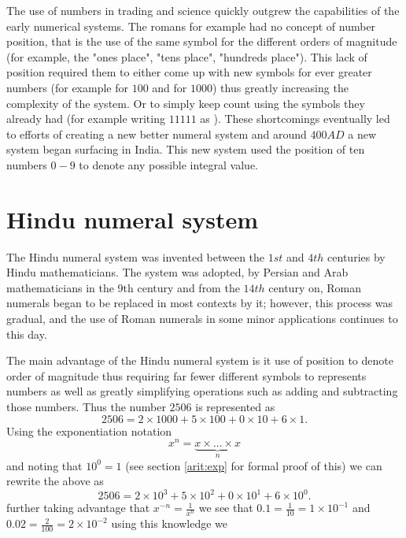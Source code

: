 \myindent The use of numbers in trading and science quickly outgrew the capabilities of the early numerical systems. The romans for example had no concept of number position, that is the use of the same symbol for the different orders of magnitude (for example, the "ones place", "tens place", "hundreds place"). This lack of position required them to either come up with new symbols for ever greater numbers (for example  for $100$ and  for $1000$) thus greatly increasing the complexity of the system. Or to simply keep count using the symbols they already had (for example writing $11111$ as ). These shortcomings eventually led to efforts of creating a new better numeral system and around $400 AD$ a new system began surfacing in India. This new system used the position of ten numbers $0-9$ to denote any possible integral value.

\section{Hindu numeral system}
The Hindu numeral system was invented between the $1st$ and $4th$ centuries by Hindu mathematicians. The system was adopted, by Persian and Arab mathematicians in the 9th century and from the $14th$ century on, Roman numerals began to be replaced in most contexts by it; however, this process was gradual, and the use of Roman numerals in some minor applications continues to this day.

The main advantage of the Hindu numeral system is it use of position to denote order of magnitude thus requiring far fewer different symbols to represents numbers as well as greatly simplifying operations such as adding and subtracting those numbers. Thus the number $2506$ is represented as
\[
2506 = 2 \times 1000 + 5 \times 100 + 0 \times 10 + 6 \times 1.
\]
Using the exponentiation notation
\[
x^n = \underbrace{x \times \dots \times x}_n
\]
and noting that $10^0 = 1$ (see section \ref{arit:exp} for formal proof of this) we can rewrite the above as
\[
2506 = 2 \times 10^3 + 5 \times 10^2 + 0 \times 10^1 + 6 \times 10^0.
\]
further taking advantage that $x^{-n} = \frac{1}{x^n}$ we see that $0.1 = \frac{1}{10} = 1 \times 10^{-1}$ and $0.02 = \frac{2}{100} = 2 \times 10^{-2}$ using this knowledge we

